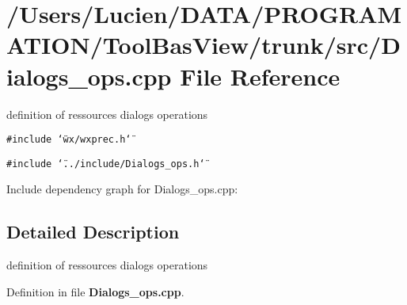 \section{/Users/Lucien/DATA/PROGRAMATION/Tool\-Bas\-View/trunk/src/Dialogs\_\-ops.cpp File Reference}
\label{_dialogs__ops_8cpp}
definition of ressources dialogs operations 

{\tt \#include \char`\"{}wx/wxprec.h\char`\"{}}\par
{\tt \#include \char`\"{}../include/Dialogs\_\-ops.h\char`\"{}}\par


Include dependency graph for Dialogs\_\-ops.cpp:

\subsection{Detailed Description}
definition of ressources dialogs operations 



Definition in file {\bf Dialogs\_\-ops.cpp}.